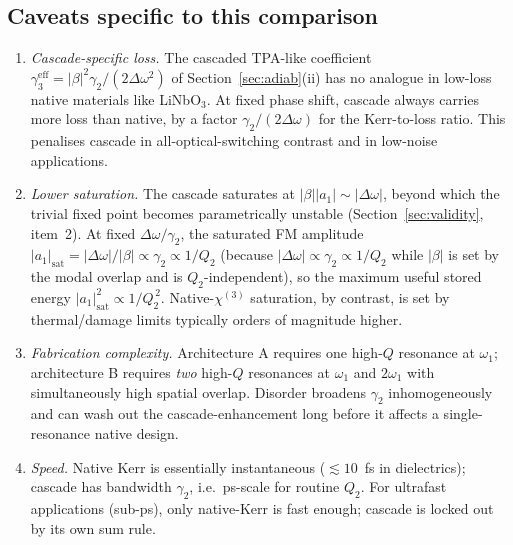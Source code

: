 \documentclass[11pt,a4paper]{article}
\newcommand{\chithree}{\chi^{(3)}}
\newcommand{\Dom}{\Delta\omega}
\begin{document}
\subsection*{Caveats specific to this comparison}

\begin{enumerate}\setlength{\itemsep}{2pt}
  \item \emph{Cascade-specific loss.}  The cascaded TPA-like
        coefficient $\gamma_3^\text{eff}=|\beta|^{2}\gamma_2/(2\Dom^{2})$
        of Section~\ref{sec:adiab}(ii) has no analogue in low-loss native materials
        like LiNbO$_3$.  At fixed phase shift, cascade always carries
        more loss than native, by a factor $\gamma_2/(2\Dom)$ for the
        Kerr-to-loss ratio.  This penalises cascade in
        all-optical-switching contrast and in low-noise applications.

  \item \emph{Lower saturation.}  The cascade saturates at
        $|\beta||a_1|\sim|\Dom|$, beyond which the trivial fixed
        point becomes parametrically unstable
        (Section~\ref{sec:validity}, item~2).  At fixed
        $\Dom/\gamma_2$, the saturated FM amplitude
        $|a_1|_\text{sat}=|\Dom|/|\beta|\propto\gamma_2\propto 1/Q_2$
        (because $|\Dom|\propto\gamma_2\propto 1/Q_2$ while $|\beta|$
        is set by the modal overlap and is $Q_2$-independent), so
        the maximum useful stored energy
        $|a_1|^{2}_\text{sat}\propto 1/Q_2^{\,2}$.  Native-$\chithree$
        saturation, by contrast, is set by thermal/damage limits
        typically orders of magnitude higher.

  \item \emph{Fabrication complexity.}  Architecture A requires one
        high-$Q$ resonance at $\omega_1$; architecture B requires
        \emph{two} high-$Q$ resonances at $\omega_1$ and $2\omega_1$
        with simultaneously high spatial overlap.  Disorder broadens
        $\gamma_2$ inhomogeneously and can wash out the cascade-enhancement
        long before it affects a single-resonance native design.

  \item \emph{Speed.}  Native Kerr is essentially instantaneous
        ($\lesssim 10$~fs in dielectrics); cascade has bandwidth
        $\gamma_2$, i.e.\ ps-scale for routine $Q_2$.  For
        ultrafast applications (sub-ps), only native-Kerr is fast
        enough; cascade is locked out by its own sum rule.
\end{enumerate}
\end{document}

